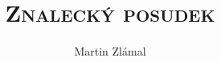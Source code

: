 \documentclass[oneside,12pt,a4paper,final]{report} %
\begin{document}
\title{\textsc{Znalecký posudek}}
\author{Martin Zlámal}
\maketitle



\end{document}
